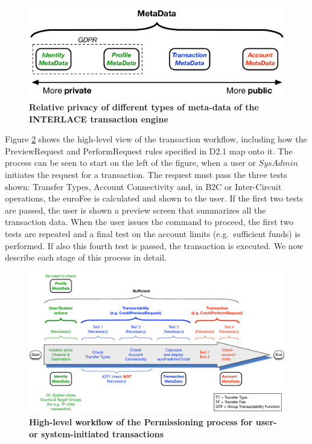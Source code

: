 \begin{figure}[h]
\centering
\includegraphics[width=13cm]{Figures/Private_Public_MetaData}
\caption{\small\textbf{Relative privacy of different types of meta-data of the INTERLACE transaction engine}}
\label{fig:privatepublicmetaData}
\end{figure}

Figure \ref{fig:transactabilitywkflow} shows the high-level view of the transaction workflow, including how the PreviewRequest and PerformRequest rules specified in D2.1 map onto it. The process can be seen to start on the left of the figure, when a user or $SysAdmin$ initiates the request for a transaction. The request must pass the three tests shown: Transfer Types, Account Connectivity and, in B2C or Inter-Circuit operations, the euroFee is calculated and shown to the user. If the first two tests are passed, the user is shown a preview screen that summarizes all the transaction data. When the user issues the command to proceed, the first two tests are repeated and a final test on the account limits (e.g.\ sufficient funds) is performed. If also this fourth test is passed, the transaction is executed. We now describe each stage of this process in detail.


\begin{figure}[h]
\centering
\includegraphics[width=17.5cm]{Figures/Transactability_Workflow}
\caption{\small\textbf{High-level workflow of the Permissioning process for user- or system-initiated transactions}}
\label{fig:transactabilitywkflow}
\end{figure}



